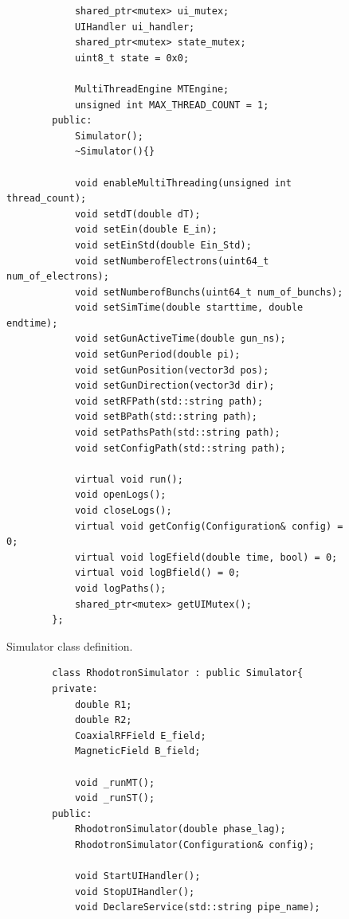\documentclass[a4paper,oneside,12pt]{report}
\numberwithin{equation}{chapter}
\begin{document}
{\begin{figure}[H]
\begin{verbatim}
            shared_ptr<mutex> ui_mutex;
            UIHandler ui_handler;
            shared_ptr<mutex> state_mutex;
            uint8_t state = 0x0;

            MultiThreadEngine MTEngine;
            unsigned int MAX_THREAD_COUNT = 1;
        public:
            Simulator();
            ~Simulator(){}

            void enableMultiThreading(unsigned int thread_count);
            void setdT(double dT);
            void setEin(double E_in);
            void setEinStd(double Ein_Std);
            void setNumberofElectrons(uint64_t num_of_electrons);
            void setNumberofBunchs(uint64_t num_of_bunchs);
            void setSimTime(double starttime, double endtime);
            void setGunActiveTime(double gun_ns);
            void setGunPeriod(double pi);
            void setGunPosition(vector3d pos);
            void setGunDirection(vector3d dir);
            void setRFPath(std::string path);
            void setBPath(std::string path);
            void setPathsPath(std::string path);
            void setConfigPath(std::string path);

            virtual void run();
            void openLogs();
            void closeLogs();
            virtual void getConfig(Configuration& config) = 0;
            virtual void logEfield(double time, bool) = 0;
            virtual void logBfield() = 0;
            void logPaths();
            shared_ptr<mutex> getUIMutex();
        };
    \end{verbatim}
    \vspace{10pt}
    \caption{Simulator class definition.}
    \label{fig:sim_class}
\end{figure}

\begin{figure}[H]
    \centering
    \begin{verbatim}
        class RhodotronSimulator : public Simulator{
        private:
            double R1;
            double R2;
            CoaxialRFField E_field;
            MagneticField B_field;

            void _runMT();
            void _runST();
        public:
            RhodotronSimulator(double phase_lag);
            RhodotronSimulator(Configuration& config);

            void StartUIHandler();
            void StopUIHandler();
            void DeclareService(std::string pipe_name);


\end{verbatim}
\end{figure}}
\end{document}

